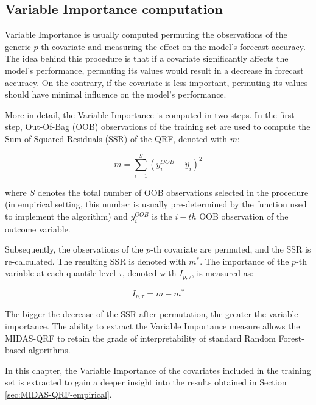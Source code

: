 \subsection{Variable Importance computation}

Variable Importance is usually computed permuting the observations of the generic $p$-th covariate and measuring the effect on the model's forecast accuracy. 
The idea behind this procedure is that if a covariate significantly affects the model's performance, permuting its values would result in a decrease in forecast accuracy. On the contrary, if the covariate is less important, permuting its values should have minimal influence on the model's performance.
\vspace{0.15in}

\noindent More in detail, the Variable Importance  is computed in two steps. In the first step, Out-Of-Bag (OOB) observations of the training set are used to compute the Sum of Squared Residuals (SSR) of the QRF, denoted with $m$:

\begin{equation}
    m=\sum_{i=1}^S (y_i^{OOB}-\hat{y}_i)^2
\end{equation}

\noindent where $S$ denotes the total number of OOB observations selected in the procedure (in empirical setting, this number is usually pre-determined by the function used to implement the algorithm) and $y_i^{OOB}$ is the $i-th$ OOB observation of the outcome variable.

\noindent Subsequently, the observations of the $p$-th covariate are permuted, and the SSR is re-calculated. The resulting SSR is denoted with $m^*$. 
The importance of the $p$-th variable at each quantile level $\tau$, denoted with $I_{p, \tau}$, is measured as:
\begin{center}
\begin{equation}
I_{p, \tau}=m-m^*
\end{equation}
\end{center}
The bigger the decrease of the SSR after permutation, the greater the variable importance.
The ability to extract the Variable Importance measure allows the MIDAS-QRF to retain the grade of interpretability of standard Random Forest-based algorithms.
\vspace{0.15in}

\noindent In this chapter, the Variable Importance of the covariates included in the training set is extracted to gain a deeper insight into the results obtained in Section \ref{sec:MIDAS-QRF-empirical}.


